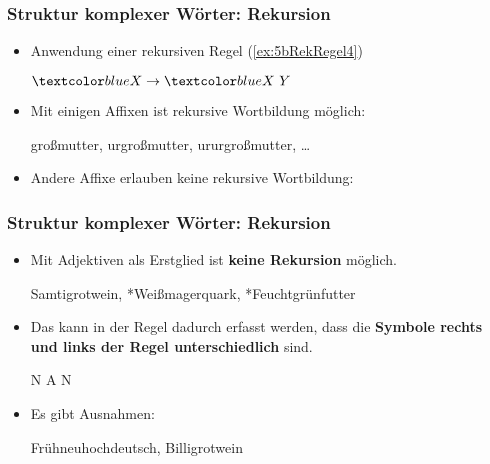 \begin{frame}
\frametitle{Struktur komplexer Wörter: Rekursion}

\begin{minipage}{.74\textwidth}

\begin{itemize}
	\item Anwendung einer rekursiven Regel (\ref{ex:5bRekRegel4})
	
	\ea \label{ex:5bRekRegel4} $\alertblue{X} \rightarrow \alertblue{X}~Y$	
	\z 
	
	\item Mit einigen Affixen ist rekursive Wortbildung möglich:
	
	\ea {}großmutter, urgroßmutter, ururgroßmutter, \ldots
	\z 
	
	\item Andere Affixe erlauben keine rekursive Wortbildung:
	\ea 
		\z 
	\z 
	
\end{itemize}

\end{minipage}
\begin{minipage}[c]{.25\textwidth}

\begin{figure}
	\centering
	\scalebox{.9}{
		\begin{forest}
			[X
				[X
					[X
						[X]
						[Y]
					]
					[Y]
				]
				[Y]
			]	
		\end{forest}	
	}
\end{figure}

\end{minipage}

\end{frame}


\begin{frame}
\frametitle{Struktur komplexer Wörter: Rekursion}

\begin{itemize}
	\item Mit Adjektiven als Erstglied ist \textbf{keine Rekursion} möglich.
	
	\ea *Samtigrotwein, *Weißmagerquark, *Feuchtgrünfutter
	\z
	
	\item Das kann in der Regel dadurch erfasst werden, dass die \textbf{Symbole rechts und links der Regel unterschiedlich} sind.
	
	\ea N \ras A N
	\z   
	
	\item Es gibt Ausnahmen:
	
	\ea Frühneuhochdeutsch, Billigrotwein
	\z 
	
\end{itemize}

\end{frame}


